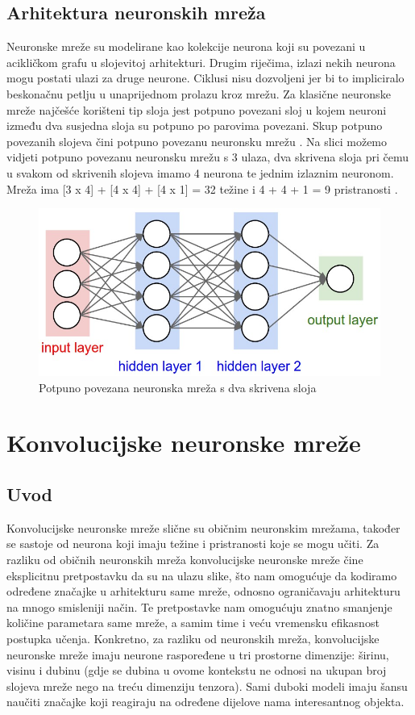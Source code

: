 \documentclass[times, utf8, diplomski]{fer}
\theoremstyle{definition}
\begin{document}
\section{Arhitektura neuronskih mreža}
Neuronske mreže su modelirane kao kolekcije neurona koji su povezani u acikličkom grafu u slojevitoj arhitekturi. Drugim riječima, izlazi nekih neurona mogu postati ulazi za druge neurone. Ciklusi nisu dozvoljeni jer bi to impliciralo beskonačnu petlju u unaprijednom prolazu kroz mrežu. Za klasične neuronske mreže najčešće korišteni tip sloja jest potpuno povezani sloj  u kojem neuroni između dva susjedna sloja su potpuno po parovima povezani. Skup potpuno povezanih slojeva čini potpuno povezanu neuronsku mrežu . Na slici možemo vidjeti potpuno povezanu neuronsku mrežu s 3 ulaza, dva skrivena sloja pri čemu u svakom od skrivenih slojeva imamo 4 neurona te jednim izlaznim neuronom. Mreža ima [3 x 4] + [4 x 4] + [4 x 1] = 32 težine i 4 + 4 + 1 = 9 pristranosti .
\begin{figure}[h]
\centering
\includegraphics[scale=0.5]{neural_net2.jpeg}
\caption{Potpuno povezana neuronska mreža s dva skrivena sloja}
\end{figure}


\chapter{Konvolucijske neuronske mreže}
\section{Uvod}
Konvolucijske neuronske mreže slične su običnim neuronskim mrežama, također se sastoje od neurona koji imaju težine i pristranosti koje se mogu učiti. Za razliku od običnih neuronskih mreža konvolucijske neuronske mreže čine eksplicitnu pretpostavku da su na ulazu slike, što nam omogućuje da kodiramo određene značajke u arhitekturu same mreže, odnosno ograničavaju arhitekturu na mnogo smisleniji način. Te pretpostavke nam omogućuju znatno smanjenje količine parametara same mreže, a samim time i veću vremensku efikasnost postupka učenja. Konkretno, za razliku od neuronskih mreža, konvolucijske neuronske mreže imaju neurone raspoređene u tri prostorne dimenzije: širinu, visinu i dubinu (gdje se dubina u ovome kontekstu ne odnosi na ukupan broj slojeva mreže nego na treću dimenziju tenzora). Sami duboki modeli imaju šansu naučiti značajke koji reagiraju na određene dijelove nama interesantnog objekta.
\end{document}
